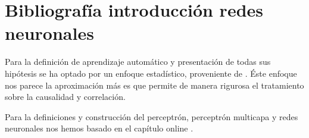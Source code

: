 
\section{Bibliografía introducción redes neuronales} 

Para la definición de aprendizaje automático y presentación de 
todas sus hipótesis se ha optado por un enfoque estadístico, proveniente de 
\cite{learning-from-data-1-2}. Éste enfoque nos parece la aproximación más es que permite de manera rigurosa 
el tratamiento sobre la causalidad y correlación.   

Para la definiciones y construcción del perceptrón, perceptrón multicapa y redes neuronales nos hemos basado 
en el capítulo online \cite{e-chapter-7-neural-networks}. 

